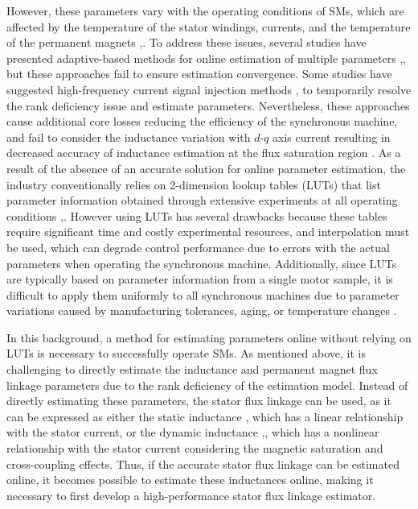 However, these parameters vary with the operating conditions of SMs, which are affected by the temperature of the stator windings, currents, and the temperature of the permanent magnets \cite{c1_17},\cite{c1_18}. To address these issues, several studies have presented adaptive-based methods for online estimation of multiple parameters \cite{c1_19},\cite{c1_20}, but these approaches fail to ensure estimation convergence. Some studies have suggested high-frequency current signal injection methods \cite{c2.3_3},\cite{c1_21} to temporarily resolve the rank deficiency issue and estimate parameters. Nevertheless, these approaches cause additional core losses reducing the efficiency of the synchronous machine, and fail to consider the inductance variation with $d$-$q$ axis current resulting in decreased accuracy of inductance estimation at the flux saturation region \cite{c1_22}. As a result of the absence of an accurate solution for online parameter estimation, the industry conventionally relies on 2-dimension lookup tables (LUTs) that list parameter information obtained through extensive experiments at all operating conditions \cite{c1_23},\cite{c1_25}. However using LUTs has several drawbacks because these tables require significant time and costly experimental resources, and interpolation must be used, which can degrade control performance due to errors with the actual parameters when operating the synchronous machine. Additionally, since LUTs are typically based on parameter information from a single motor sample, it is difficult to apply them uniformly to all synchronous machines due to parameter variations caused by manufacturing tolerances, aging, or temperature changes \cite{c1_24}.

In this background, a method for estimating parameters online without relying on LUTs is necessary to successfully operate SMs. As mentioned above, it is challenging to directly estimate the inductance and permanent magnet flux linkage parameters due to the rank deficiency of the estimation model. Instead of directly estimating these parameters, the stator flux linkage can be used, as it can be expressed as either the static inductance \cite{c2.1_3}, which has a linear relationship with the stator current, or the dynamic inductance \cite{c2.1_3},\cite{c1_26}, which has a nonlinear relationship with the stator current considering the magnetic saturation and cross-coupling effects. Thus, if the accurate stator flux linkage can be estimated online, it becomes possible to estimate these inductances online, making it necessary to first develop a high-performance stator flux linkage estimator.

